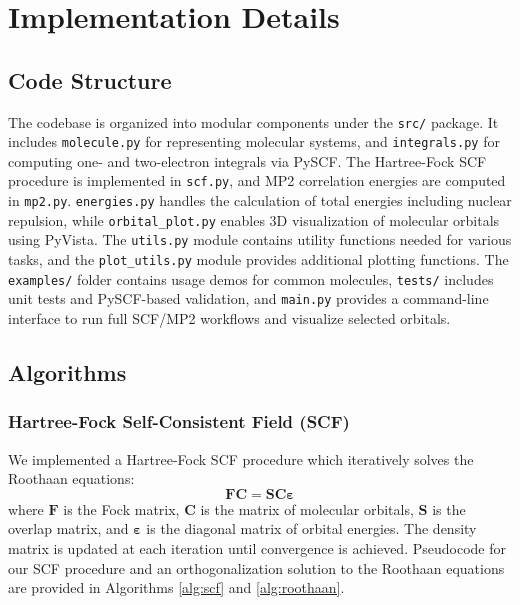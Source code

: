 \documentclass[12pt]{article}
\begin{document}
\section{Implementation Details}

\subsection{Code Structure}

The codebase is organized into modular components under the \texttt{src/} package. It includes \texttt{molecule.py} for representing molecular systems, and \texttt{integrals.py} for computing one- and two-electron integrals via PySCF. The Hartree-Fock SCF procedure is implemented in \texttt{scf.py}, and MP2 correlation energies are computed in \texttt{mp2.py}. \texttt{energies.py} handles the calculation of total energies including nuclear repulsion, while \texttt{orbital\_plot.py} enables 3D visualization of molecular orbitals using PyVista. The \texttt{utils.py} module contains utility functions needed for various tasks, and the \texttt{plot\_utils.py} module provides additional plotting functions. The \texttt{examples/} folder contains usage demos for common molecules, \texttt{tests/} includes unit tests and PySCF-based validation, and \texttt{main.py} provides a command-line interface to run full SCF/MP2 workflows and visualize selected orbitals.

\subsection{Algorithms}

\subsubsection*{Hartree-Fock Self-Consistent Field (SCF)}

We implemented a Hartree-Fock SCF procedure which iteratively solves the Roothaan equations:
\[
\mathbf{F} \mathbf{C} = \mathbf{S} \mathbf{C} \boldsymbol{\varepsilon}
\]
where $\mathbf{F}$ is the Fock matrix, $\mathbf{C}$ is the matrix of molecular orbitals, $\mathbf{S}$ is the overlap matrix, and $\boldsymbol{\varepsilon}$ is the diagonal matrix of orbital energies. The density matrix is updated at each iteration until convergence is achieved. Pseudocode for our SCF procedure and an orthogonalization solution to the Roothaan equations are provided in Algorithms \ref{alg:scf} and \ref{alg:roothaan}. 
\end{document}
